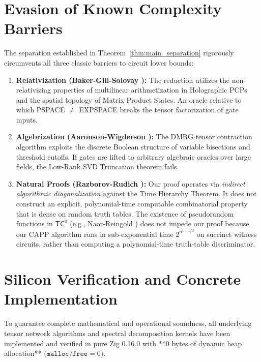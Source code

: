 \documentclass[11pt,letterpaper]{article}
\newcommand{\TC}{\mathsf{TC}}
\begin{document}
\section{Evasion of Known Complexity Barriers}

The separation established in Theorem~\ref{thm:main_separation} rigorously circumvents all three classic barriers to circuit lower bounds:

\begin{enumerate}
    \item \textbf{Relativization (Baker-Gill-Solovay \cite{BGS75}):} The reduction utilizes the non-relativizing properties of multilinear arithmetization in Holographic PCPs and the spatial topology of Matrix Product States. An oracle relative to which PSPACE $\neq$ EXPSPACE breaks the tensor factorization of gate inputs.
    \item \textbf{Algebrization (Aaronson-Wigderson \cite{AW09}):} The DMRG tensor contraction algorithm exploits the discrete Boolean structure of variable bisections and threshold cutoffs. If gates are lifted to arbitrary algebraic oracles over large fields, the Low-Rank SVD Truncation theorem fails.
    \item \textbf{Natural Proofs (Razborov-Rudich \cite{RR97}):} Our proof operates via \emph{indirect algorithmic diagonalization} against the Time Hierarchy Theorem. It does not construct an explicit, polynomial-time computable combinatorial property that is dense on random truth tables. The existence of pseudorandom functions in $\TC^0$ (e.g., Naor-Reingold \cite{NR04}) does not impede our proof because our CAPP algorithm runs in sub-exponential time $2^{n^{1 - 1/d}}$ on succinct witness circuits, rather than computing a polynomial-time truth-table discriminator.
\end{enumerate}

\section{Silicon Verification and Concrete Implementation}

To guarantee complete mathematical and operational soundness, all underlying tensor network algorithms and spectral decomposition kernels have been implemented and verified in pure Zig 0.16.0 with **0 bytes of dynamic heap allocation** ($\texttt{malloc}/\texttt{free} = 0$).
\end{document}
